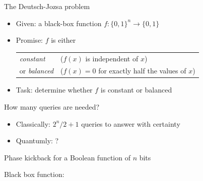 \begin{frame}{The Deutsch-Jozsa problem}

\begin{prob}
\begin{itemize}
\item Given: a black-box function $f:\{0,1\}^n \to \{0,1\}$
\item Promise: $f$ is either
\begin{tabular}{@{}ll@{}}
  \emph{constant} & ($f(x)$ is independent of $x$) \\
  or \emph{balanced} & ($f(x)=0$ for exactly half the values of $x$)
\end{tabular}
\item Task: determine whether $f$ is {constant} or {balanced}
\end{itemize}
\end{prob}

\pause
\bigskip

How many queries are needed? \pause
\begin{itemize}
\item Classically: $2^n/2 + 1$ queries to answer with certainty \pause
\item Quantumly: ?
\end{itemize}

\end{frame}


\begin{frame}{Phase kickback for a Boolean function of $n$ bits}

Black box function: \hspace{1.5ex}

  \bigskip
  \bigskip


\end{frame}

